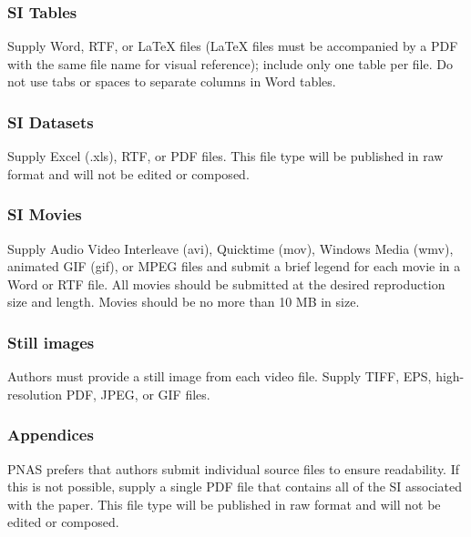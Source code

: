 \documentclass[9pt,twocolumn,twoside,]{pnas-new}
\begin{document}
\hypertarget{si-tables}{%
\subsubsection{SI Tables}\label{si-tables}}

Supply Word, RTF, or LaTeX files (LaTeX files must be accompanied by a
PDF with the same file name for visual reference); include only one
table per file. Do not use tabs or spaces to separate columns in Word
tables.

\hypertarget{si-datasets}{%
\subsubsection{SI Datasets}\label{si-datasets}}

Supply Excel (.xls), RTF, or PDF files. This file type will be published
in raw format and will not be edited or composed.

\hypertarget{si-movies}{%
\subsubsection{SI Movies}\label{si-movies}}

Supply Audio Video Interleave (avi), Quicktime (mov), Windows Media
(wmv), animated GIF (gif), or MPEG files and submit a brief legend for
each movie in a Word or RTF file. All movies should be submitted at the
desired reproduction size and length. Movies should be no more than 10
MB in size.

\hypertarget{still-images}{%
\subsubsection{Still images}\label{still-images}}

Authors must provide a still image from each video file. Supply TIFF,
EPS, high-resolution PDF, JPEG, or GIF files.

\hypertarget{appendices}{%
\subsubsection{Appendices}\label{appendices}}

PNAS prefers that authors submit individual source files to ensure
readability. If this is not possible, supply a single PDF file that
contains all of the SI associated with the paper. This file type will be
published in raw format and will not be edited or composed.

\showmatmethods
\showacknow
\pnasbreak
\end{document}
